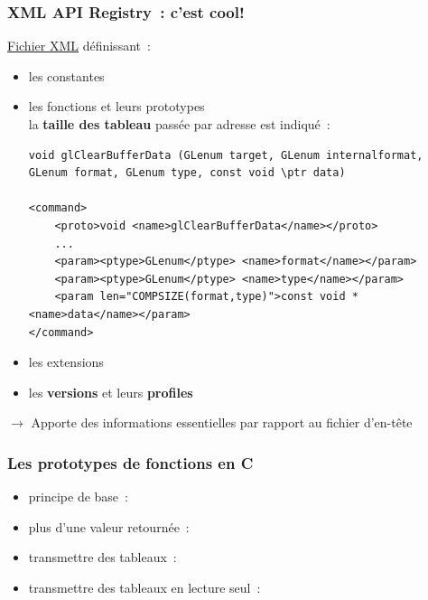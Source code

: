 \begin{frame}[fragile]
  \frametitle{XML API Registry~:  c'est cool!}
  \href{https://www.opengl.org/registry}{Fichier XML} définissant~: \\
  \begin{itemize}
    \item les constantes
    \item les fonctions et leurs prototypes \\
      \scriptsize{la \textbf{taille des tableau} passée par adresse est indiqué~:}
      {\tiny%
\begin{verbatim}
void glClearBufferData (GLenum target, GLenum internalformat, GLenum format, GLenum type, const void \ptr data)

<command>
    <proto>void <name>glClearBufferData</name></proto>
    ...
    <param><ptype>GLenum</ptype> <name>format</name></param>
    <param><ptype>GLenum</ptype> <name>type</name></param>
    <param len="COMPSIZE(format,type)">const void *<name>data</name></param>
</command>
\end{verbatim}}
    \item les extensions
    \item les \textbf{versions} et leurs \textbf{profiles}
  \end{itemize}
  \centerline{\alert{$\longrightarrow$ Apporte des informations essentielles par rapport au fichier d'en-tête}}
\end{frame}

\begin{frame}
  \frametitle{Les prototypes de fonctions en C}
  \begin{itemize}
    \item principe de base~: \\
    \item plus d'une valeur retournée~: \\
    \item transmettre des tableaux~: \\
    \item transmettre des tableaux en lecture seul~: \\
  \end{itemize}
\end{frame}

